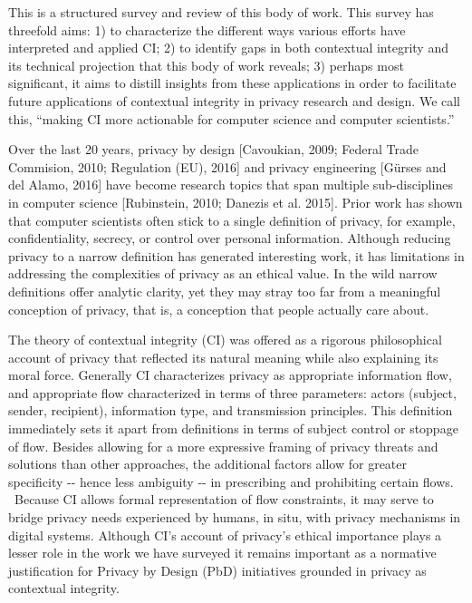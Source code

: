 \documentclass[../thesis.tex]{subfiles}
\begin{document}
This is a structured survey and review of this body of work. This survey
has threefold aims: 1) to characterize the different ways various
efforts have interpreted and applied CI; 2) to identify gaps in both
contextual integrity and its technical projection that this body of
work reveals; 3) perhaps most significant, it aims to distill insights
from these applications in order to facilitate future applications of
contextual integrity in privacy research and design. We call this,
``making CI more actionable for computer science and
computer scientists.''

Over the last 20 years, privacy by design [Cavoukian, 2009; Federal
Trade Commision, 2010; Regulation (EU), 2016] and privacy engineering
[G\"urses and del Alamo, 2016] have become research topics that span
multiple sub-disciplines in computer science [Rubinstein, 2010; Danezis
et al. 2015]. Prior work has shown that computer scientists often stick
to a single definition of privacy, for example, confidentiality,
secrecy, or control over personal information. Although reducing
privacy to a narrow definition has generated interesting work, it has
limitations in addressing the complexities of privacy as an ethical
value. In the wild narrow definitions offer analytic clarity, yet they
may stray too far from a meaningful conception of privacy, that is, a
conception that people actually care about. 

The theory of contextual integrity (CI) was offered as a rigorous
philosophical account of privacy that reflected its natural meaning
while also explaining its moral force. Generally CI characterizes
privacy as appropriate information flow, and appropriate flow
characterized in terms of three parameters: actors (subject, sender,
recipient), information type, and transmission principles. This
definition immediately sets it apart from definitions in terms of
subject control or stoppage of flow. Besides allowing for a more
expressive framing of privacy threats and solutions than other
approaches, the additional factors allow for greater specificity -{}-
hence less ambiguity -{}- in prescribing and prohibiting certain flows.
\ Because CI allows formal representation of flow constraints, it may
serve to bridge privacy needs experienced by humans, in situ, with
privacy mechanisms in digital systems. Although CI's
account of privacy's ethical importance plays a lesser
role in the work we have surveyed it remains important as a normative
justification for Privacy by Design (PbD) initiatives grounded in
privacy as contextual integrity.
\end{document}
